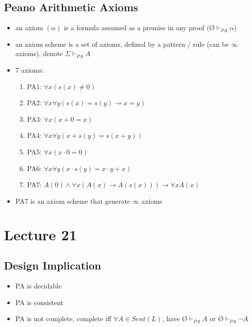 \documentclass[11pt]{article}
\begin{document}
\subsection{Peano Arithmetic Axioms}
\begin{itemize}
    \item an axiom $(\alpha)$ is a formula assumed as a premise in any proof (\O$\vdash_{PA}\alpha$)
    \item an axiom scheme is a set of axioms, defined by a pattern / rule (can be $\infty$ axioms), denote $\Sigma\vdash_{PA}A$
    \item 7 axioms:
    \begin{enumerate}
        \item PA1: $\forall x(s(x)\neq 0)$
        \item PA2: $\forall x\forall y(s(x)=s(y)\rightarrow x=y)$
        \item PA3: $\forall x(x+0=x)$
        \item PA4: $\forall x\forall y(x+s(y)=s(x+y))$
        \item PA5: $\forall x(x\cdot 0=0)$
        \item PA6: $\forall x\forall y(x\cdot s(y)=x\cdot y+x)$
        \item PA7: $A(0)\land\forall x(A(x)\rightarrow A(s(x)))\rightarrow \forall x A(x)$
    \end{enumerate}
    \item PA7 is an axiom scheme that generate $\infty$ axioms 
\end{itemize}

\section{Lecture 21}
\subsection{Design Implication}
\begin{itemize}
    \item PA is decidable 
    \item PA is consistent 
    \item PA is not complete, complete iff $\forall A\in Sent(L)$, have \O$\vdash_{PA}A$ or \O$\vdash_{PA}\neg A$
\end{itemize}
\end{document}
